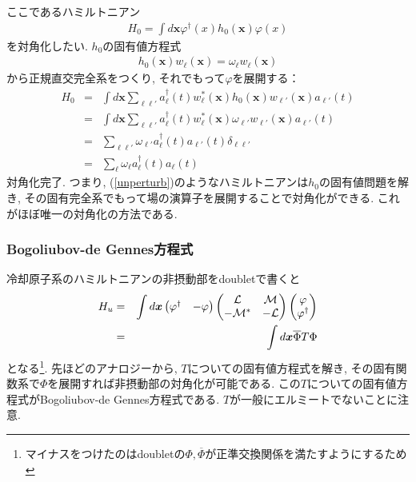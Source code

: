 \documentclass[10.5pt,a4paper]{jreport}
\newcommand{\calM}{{\cal M}}
\newcommand{\calL}{{\cal L}}
\begin{document}
ここであるハミルトニアン
\begin{eqnarray}
  H_0 = \int d\bm{x} \varphi^\dagger(x)h_0(\bm{x})\varphi(x)\label{unperturb}
\end{eqnarray}
を対角化したい. $h_0$の固有値方程式
\begin{eqnarray}
  h_0(\bm{x})w_\ell(\bm{x}) = \omega_\ell w_\ell(\bm{x})
\end{eqnarray}
から正規直交完全系をつくり, それでもって$\varphi$を展開する：
\begin{eqnarray}
  H_0 &=& \int d\bm{x} \sum_{\ell\ell'}a^\dagger_\ell(t)w^*_\ell(\bm{x})h_0(\bm{x})w_{\ell'}(\bm{x})a_{\ell'}(t)\\
  &=& \int d\bm{x} \sum_{\ell\ell'}a^\dagger_\ell(t)w^*_\ell(\bm{x})\omega_{\ell'}w_{\ell'}(\bm{x})a_{\ell'}(t)\\
  &=& \sum_{\ell\ell'}\omega_{\ell'}a^\dagger_\ell(t)a_{\ell'}(t)\delta_{\ell\ell'}\\
  &=& \sum_{\ell}\omega_{\ell}a^\dagger_\ell(t)a_{\ell}(t)
\end{eqnarray}
対角化完了. つまり, (\ref{unperturb})のようなハミルトニアンは$h_0$の固有値問題を解き, その固有完全系でもって場の演算子を展開することで対角化ができる. これがほぼ唯一の対角化の方法である.
\subsubsection{Bogoliubov-de Gennes方程式}
冷却原子系のハミルトニアンの非摂動部をdoubletで書くと
\begin{eqnarray}
  H_u &=&  \int d\bm{x}
  \begin{pmatrix}
    \varphi^\dagger&-\varphi 
  \end{pmatrix}
  \begin{pmatrix}
    \calL &\calM\\
    -\calM^* &-\calL
  \end{pmatrix}
  \begin{pmatrix}
    \varphi\\
    \varphi^\dagger 
  \end{pmatrix}\\
  &=& \int d\bm{x} \overline{\Phi}T\Phi
\end{eqnarray}
となる\footnote{マイナスをつけたのはdoubletの$\Phi, \overline{\Phi}$が正準交換関係を満たすようにするため}. 先ほどのアナロジーから, $T$についての固有値方程式を解き, その固有関数系で$\Phi$を展開すれば非摂動部の対角化が可能である. この$T$についての固有値方程式がBogoliubov-de Gennes方程式である. $T$が一般にエルミートでないことに注意.
\end{document}
